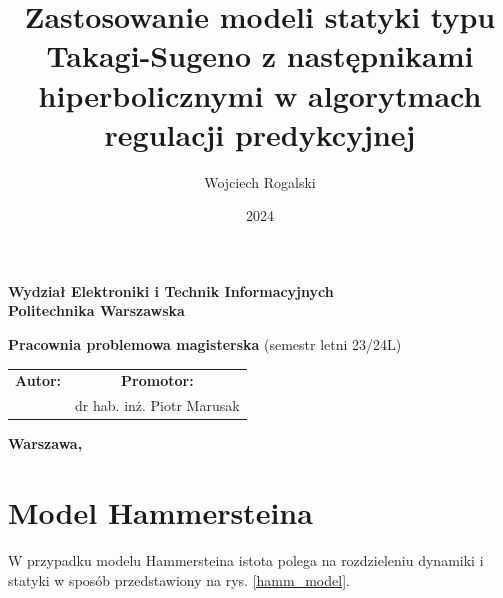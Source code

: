 \documentclass[a4paper,titlepage,11pt,floatssmall]{mwrep}
\begin{document}
\frenchspacing
\pagestyle{uheadings}

\title{\bf Zastosowanie modeli statyki typu Takagi-Sugeno z następnikami hiperbolicznymi w algorytmach regulacji predykcyjnej}
\author{Wojciech Rogalski}
\date{2024}

\makeatletter
\renewcommand{\maketitle}{\begin{titlepage}
\begin{center}{\LARGE {\bf
Wydział Elektroniki i Technik Informacyjnych}}\\
\vspace{0.4cm}
{\LARGE {\bf Politechnika Warszawska}}\\
\vspace{0.3cm}
\end{center}
\vspace{5cm}
\begin{center}
{\bf \LARGE Pracownia problemowa magisterska \vskip 0.1cm}
(semestr letni 23/24L)
\end{center}
\vspace{1cm}
\begin{center}
{\bf \LARGE \@title \vskip 0.1cm}
\end{center}
\vspace{2cm}
\begin{center}
\begin{tabular}{@{}c@{\hspace{2cm}}c@{}}
\bf \Large Autor: & \bf \Large Promotor: \\
\@author & dr hab. inż. Piotr Marusak
\end{tabular}
\end{center}
\vspace*{\stretch{6}}
\begin{center}
\bf{\large{Warszawa, \@date\vskip 0.1cm}}
\end{center}
\end{titlepage}
}
\makeatother
\maketitle
\tableofcontents




\chapter{Model Hammersteina}
W przypadku modelu Hammersteina istota polega na rozdzieleniu dynamiki i statyki w sposób przedstawiony na rys. \ref{hamm_model}.
\end{document}
